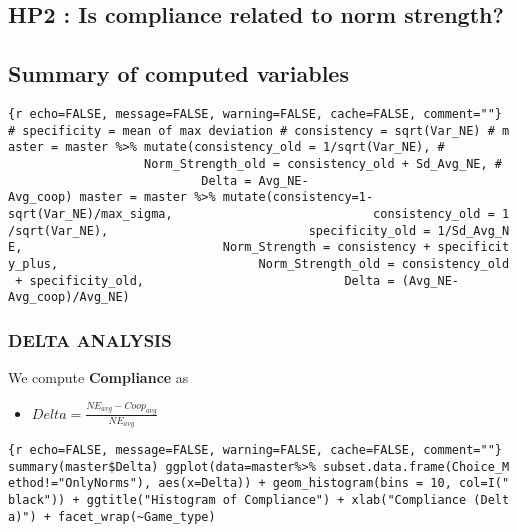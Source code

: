 \hypertarget{hp2-is-compliance-related-to-norm-strength}{%
\subsection{HP2 : Is compliance related to norm
strength?}\label{hp2-is-compliance-related-to-norm-strength}}

\hypertarget{summary-of-computed-variables}{%
\subsection{Summary of computed
variables}\label{summary-of-computed-variables}}

\texttt{\{r\ echo=FALSE,\ message=FALSE,\ warning=FALSE,\ cache=FALSE,\ comment=""\}\ \#\ specificity\ =\ mean\ of\ max\ deviation\ \#\ consistency\ =\ sqrt(Var\_NE)\ \#\ master\ =\ master\ \%\textgreater{}\%\ mutate(consistency\_old\ =\ 1/sqrt(Var\_NE),\ \#\ \ \ \ \ \ \ \ \ \ \ \ \ \ \ \ \ \ \ \ \ \ \ \ \ \ \ \ Norm\_Strength\_old\ =\ consistency\_old\ +\ Sd\_Avg\_NE,\ \#\ \ \ \ \ \ \ \ \ \ \ \ \ \ \ \ \ \ \ \ \ \ \ \ \ \ \ \ Delta\ =\ Avg\_NE-Avg\_coop)\ master\ =\ master\ \%\textgreater{}\%\ mutate(consistency=1-sqrt(Var\_NE)/max\_sigma,\ \ \ \ \ \ \ \ \ \ \ \ \ \ \ \ \ \ \ \ \ \ \ \ \ \ \ \ consistency\_old\ =\ 1/sqrt(Var\_NE),\ \ \ \ \ \ \ \ \ \ \ \ \ \ \ \ \ \ \ \ \ \ \ \ \ \ \ \ specificity\_old\ =\ 1/Sd\_Avg\_NE,\ \ \ \ \ \ \ \ \ \ \ \ \ \ \ \ \ \ \ \ \ \ \ \ \ \ \ \ Norm\_Strength\ =\ consistency\ +\ specificity\_plus,\ \ \ \ \ \ \ \ \ \ \ \ \ \ \ \ \ \ \ \ \ \ \ \ \ \ \ \ Norm\_Strength\_old\ =\ consistency\_old\ +\ specificity\_old,\ \ \ \ \ \ \ \ \ \ \ \ \ \ \ \ \ \ \ \ \ \ \ \ \ \ \ \ Delta\ =\ (Avg\_NE-Avg\_coop)/Avg\_NE)}

\hypertarget{delta-analysis}{%
\subsubsection{DELTA ANALYSIS}\label{delta-analysis}}

We compute \textbf{Compliance} as

\begin{itemize}
\tightlist
\item
  \(Delta = \frac{NE_{avg}-Coop_{avg}}{NE_{avg}}\)
\end{itemize}

\texttt{\{r\ echo=FALSE,\ message=FALSE,\ warning=FALSE,\ cache=FALSE,\ comment=""\}\ summary(master\$Delta)\ ggplot(data=master\%\textgreater{}\%\ subset.data.frame(Choice\_Method!="OnlyNorms"),\ aes(x=Delta))\ +\ geom\_histogram(bins\ =\ 10,\ col=I("black"))\ +\ ggtitle("Histogram\ of\ Compliance")\ +\ xlab("Compliance\ (Delta)")\ +\ facet\_wrap(\textasciitilde{}Game\_type)}

